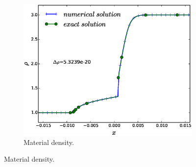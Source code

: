 \documentclass[times,doublespace]{fldauth}%
\begin{document}
\begin{figure}[h]
    ~
    \begin{subfigure}{0.32\textwidth}
    \centering
    \includegraphics[width=\linewidth]{figures/dpt-xs/mach-3-density-nel-1000-plot.eps}
    \caption{Material density.}\label{fig:mach-3-dpt-xs-dens}
    \end{subfigure}
    

\end{figure}
\end{document}
